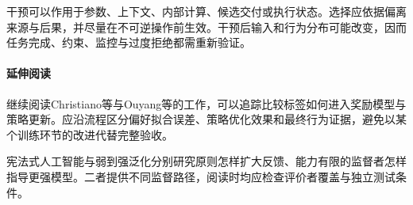 干预可以作用于参数、上下文、内部计算、候选交付或执行状态。选择应依据偏离来源与后果，并尽量在不可逆操作前生效。干预后输入和行为分布可能改变，因而任务完成、约束、监控与过度拒绝都需重新验证。

\paragraph{延伸阅读}

继续阅读Christiano等与Ouyang等的工作，可以追踪比较标签如何进入奖励模型与策略更新。应沿流程区分偏好拟合误差、策略优化效果和最终行为证据，避免以某个训练环节的改进代替完整验收。

宪法式人工智能与弱到强泛化分别研究原则怎样扩大反馈、能力有限的监督者怎样指导更强模型。二者提供不同监督路径，阅读时均应检查评价者覆盖与独立测试条件。